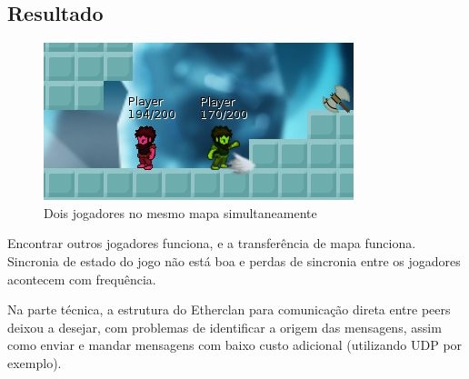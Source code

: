   \subsection{Resultado}
    \begin{figure}[h]
      \centering
      \includegraphics{imagens/vikings-multiplayer.png}
      \caption{Dois jogadores no mesmo mapa simultaneamente}
    \end{figure}
  
    Encontrar outros jogadores funciona, e a transferência de mapa funciona. Sincronia de estado do
    jogo não está boa e perdas de sincronia entre os jogadores acontecem com frequência.
    
    Na parte técnica, a estrutura do Etherclan para comunicação direta entre peers deixou a desejar,
    com problemas de identificar a origem das mensagens, assim como enviar e mandar mensagens com
    baixo custo adicional (utilizando UDP por exemplo).
